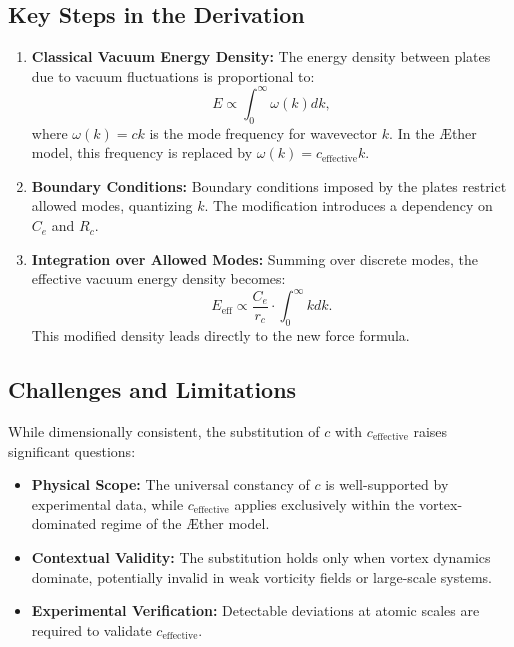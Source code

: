 \documentclass[a4paper,10pt]{article}
\begin{document}
    \subsection*{Key Steps in the Derivation}
    \begin{enumerate}
        \item \textbf{Classical Vacuum Energy Density:} The energy density between plates due to vacuum fluctuations is proportional to:
        \begin{equation*}
            E \propto \int_0^\infty \omega(k) dk,
        \end{equation*}
        where $\omega(k) = c k$ is the mode frequency for wavevector $k$. In the Æther model, this frequency is replaced by $\omega(k) = c_\text{effective} k$.
        \item \textbf{Boundary Conditions:} Boundary conditions imposed by the plates restrict allowed modes, quantizing $k$. The modification introduces a dependency on $C_e$ and $R_c$.
        \item \textbf{Integration over Allowed Modes:} Summing over discrete modes, the effective vacuum energy density becomes:
        \begin{equation*}
            E_\text{eff} \propto \frac{C_e}{r_c} \cdot \int_0^\infty k dk.
        \end{equation*}
        This modified density leads directly to the new force formula.
    \end{enumerate}

    \subsection*{Challenges and Limitations}
    While dimensionally consistent, the substitution of $c$ with $c_\text{effective}$ raises significant questions:
    \begin{itemize}
        \item \textbf{Physical Scope:} The universal constancy of $c$ is well-supported by experimental data, while $c_\text{effective}$ applies exclusively within the vortex-dominated regime of the Æther model.
        \item \textbf{Contextual Validity:} The substitution holds only when vortex dynamics dominate, potentially invalid in weak vorticity fields or large-scale systems.
        \item \textbf{Experimental Verification:} Detectable deviations at atomic scales are required to validate $c_\text{effective}$.
    \end{itemize}
\end{document}
